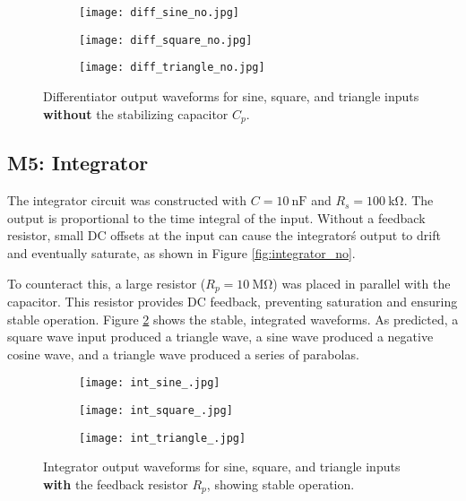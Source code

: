 \documentclass[12pt,a4paper]{article}
\begin{document}
\begin{figure}[H]
    \centering
    \begin{subfigure}[b]{0.32\linewidth}
        \texttt{[image: diff\_sine\_no.jpg]} 
    \end{subfigure}
    \begin{subfigure}[b]{0.32\linewidth}
        \texttt{[image: diff\_square\_no.jpg]} 
    \end{subfigure}
    \begin{subfigure}[b]{0.32\linewidth}
        \texttt{[image: diff\_triangle\_no.jpg]} 
    \end{subfigure}
    \caption{Differentiator output waveforms for sine, square, and triangle inputs \textbf{without} the stabilizing capacitor \(C_p\).}
    \label{fig:differentiator_no}
\end{figure}


\subsection{M5: Integrator}
The integrator circuit was constructed with \(C = \SI{10}{\nano\farad}\) and \(R_s = \SI{100}{\kilo\ohm}\). The output is proportional to the time integral of the input. Without a feedback resistor, small DC offsets at the input can cause the integrator\'s output to drift and eventually saturate, as shown in Figure \ref{fig:integrator_no}.

To counteract this, a large resistor (\(R_p = \SI{10}{\mega\ohm}\)) was placed in parallel with the capacitor. This resistor provides DC feedback, preventing saturation and ensuring stable operation. Figure \ref{fig:integrator_} shows the stable, integrated waveforms. As predicted, a square wave input produced a triangle wave, a sine wave produced a negative cosine wave, and a triangle wave produced a series of parabolas.

\begin{figure}[H]
    \centering
    \begin{subfigure}[b]{0.32\linewidth}
        \texttt{[image: int\_sine\_.jpg]} 
    \end{subfigure}
    \begin{subfigure}[b]{0.32\linewidth}
        \texttt{[image: int\_square\_.jpg]} 
    \end{subfigure}
    \begin{subfigure}[b]{0.32\linewidth}
        \texttt{[image: int\_triangle\_.jpg]} 
    \end{subfigure}
    \caption{Integrator output waveforms for sine, square, and triangle inputs \textbf{with} the feedback resistor \(R_p\), showing stable operation.}
    \label{fig:integrator_}
\end{figure}
\end{document}
